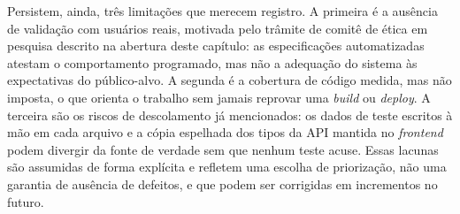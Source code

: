 Persistem, ainda, três limitações que merecem registro. A primeira é a ausência
de validação com usuários reais, motivada pelo trâmite de comitê de ética em
pesquisa descrito na abertura deste capítulo: as especificações automatizadas
atestam o comportamento programado, mas não a adequação do sistema às
expectativas do público-alvo. A segunda é a cobertura de código medida, mas não
imposta, o que orienta o trabalho sem jamais reprovar uma \textit{build} ou
\textit{deploy}. A terceira são os riscos de descolamento já mencionados: os
dados de teste escritos à mão em cada arquivo e a cópia espelhada dos tipos da
API mantida no \textit{frontend} podem divergir da fonte de verdade sem que
nenhum teste acuse. Essas lacunas são assumidas de forma explícita e refletem
uma escolha de priorização, não uma garantia de ausência de defeitos, e que
podem ser corrigidas em incrementos no futuro.
